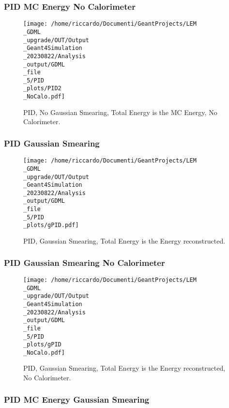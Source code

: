 \documentclass[8pt]{beamer}
\begin{document}
            \begin{frame}
                \frametitle{PID MC Energy No Calorimeter}
            
        \begin{figure}[h]
            \centering
            \texttt{[image: /home/riccardo/Documenti/GeantProjects/LEM\\\_GDML\\\_upgrade/OUT/Output\\\_Geant4Simulation\\\_20230822/Analysis\\\_output/GDML\\\_file\\\_5/PID\\\_plots/PID2\\\_NoCalo.pdf]}
            \caption{PID, No Gaussian Smearing, Total Energy is the MC Energy, No Calorimeter.}
        \end{figure}
        
            \end{frame}
            
            \begin{frame}
                \frametitle{PID Gaussian Smearing}
            
        \begin{figure}[h]
            \centering
            \texttt{[image: /home/riccardo/Documenti/GeantProjects/LEM\\\_GDML\\\_upgrade/OUT/Output\\\_Geant4Simulation\\\_20230822/Analysis\\\_output/GDML\\\_file\\\_5/PID\\\_plots/gPID.pdf]}
            \caption{PID, Gaussian Smearing, Total Energy is the Energy reconstructed.}
        \end{figure}
        
            \end{frame}
            
            \begin{frame}
                \frametitle{PID Gaussian Smearing No Calorimeter}
            
        \begin{figure}[h]
            \centering
            \texttt{[image: /home/riccardo/Documenti/GeantProjects/LEM\\\_GDML\\\_upgrade/OUT/Output\\\_Geant4Simulation\\\_20230822/Analysis\\\_output/GDML\\\_file\\\_5/PID\\\_plots/gPID\\\_NoCalo.pdf]}
            \caption{PID, Gaussian Smearing, Total Energy is the Energy reconstructed, No Calorimeter.}
        \end{figure}
        
            \end{frame}
            
            \begin{frame}
                \frametitle{PID MC Energy Gaussian Smearing}
            
            \end{frame}
            
\end{document}
